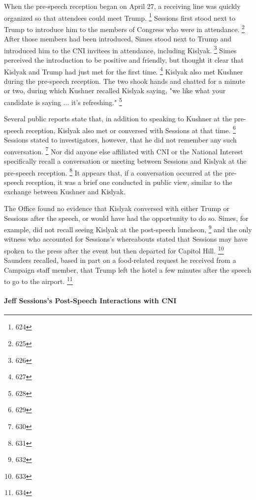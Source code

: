 When the pre-speech reception began on April 27, a receiving line was quickly organized so that attendees could meet Trump.%
\footnote{624}
Sessions first stood next to Trump to introduce him to the members of Congress who were in attendance.%
\footnote{625}
After those members had been introduced, Simes stood next to Trump and introduced him to the CNI invitees in attendance, including Kislyak.%
\footnote{626}
Simes perceived the introduction to be positive and friendly, but thought it clear that Kislyak and Trump had just met for the first time.%
\footnote{627}
Kislyak also met Kushner during the pre-speech reception.
The two shook hands and chatted for a minute or two, during which Kushner recalled Kislyak saying, "we like what your candidate is saying ... it's refreshing."%
\footnote{628}

Several public reports state that, in addition to speaking to Kushner at the pre-speech reception, Kislyak also met or conversed with Sessions at that time.%
\footnote{629}
Sessions stated to investigators, however, that he did not remember any such conversation.%
\footnote{630}
Nor did anyone else affiliated with CNI or the National Interest specifically recall a conversation or meeting between Sessions and Kislyak at the pre-speech reception.%
\footnote{631}
It appears that, if a conversation occurred at the pre-speech reception, it was a brief one conducted in public view, similar to the exchange between Kushner and Kislyak.

The Office found no evidence that Kislyak conversed with either Trump or Sessions after the speech, or would have had the opportunity to do so.
Simes, for example, did not recall seeing Kislyak at the post-speech luncheon,%
\footnote{632}
and the only witness who accounted for Sessions's whereabouts stated that Sessions may have spoken to the press after the event but then departed for Capitol Hill.%
\footnote{633}
Saunders recalled, based in part on a food-related request he received from a Campaign staff member, that Trump left the hotel a few minutes after the speech to go to the airport.%
\footnote{634}

\paragraph{Jeff Sessions's Post-Speech Interactions with CNI}

